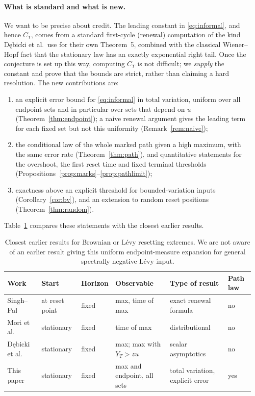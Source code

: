\documentclass[11pt,a4paper]{article}
\begin{document}
\paragraph{What is standard and what is new.}
We want to be precise about credit. The leading constant in \eqref{eq:informal}, and hence $C_T$, comes from a standard first-cycle (renewal) computation of the kind D\k{e}bicki et al.\ use for their own Theorem~5, combined with the classical Wiener--Hopf fact that the stationary law has an exactly exponential right tail. Once the conjecture is set up this way, computing $C_T$ is not difficult; we \emph{supply} the constant and prove that the bounds are strict, rather than claiming a hard resolution. The new contributions are:
\begin{enumerate}
\item an explicit error bound for \eqref{eq:informal} in total variation, uniform over all endpoint sets and in particular over sets that depend on $u$ (Theorem~\ref{thm:endpoint}); a naive renewal argument gives the leading term for each fixed set but not this uniformity (Remark~\ref{rem:naive});
\item the conditional law of the whole marked path given a high maximum, with the same error rate (Theorem~\ref{thm:path}), and quantitative statements for the overshoot, the first reset time and fixed terminal thresholds (Propositions~\ref{prop:marks}--\ref{prop:pathlimit});
\item exactness above an explicit threshold for bounded-variation inputs (Corollary~\ref{cor:bv}), and an extension to random reset positions (Theorem~\ref{thm:random}).
\end{enumerate}
Table~\ref{tab:prior} compares these statements with the closest earlier results.

\begin{table}[h]
\centering\small
\setlength{\tabcolsep}{3pt}\begin{tabular}{@{}>{\raggedright\arraybackslash}p{2.8cm}>{\raggedright\arraybackslash}p{1.7cm}>{\raggedright\arraybackslash}p{1.2cm}>{\raggedright\arraybackslash}p{3.3cm}>{\raggedright\arraybackslash}p{3.0cm}>{\raggedright\arraybackslash}p{1.0cm}@{}}
\toprule
Work & Start & Horizon & Observable & Type of result & Path law \\
\midrule
Singh--Pal \cite{SP2021} & at reset point & fixed & max, time of max & exact renewal formula & no\\
Mori et al.\ \cite{MMS2021} & stationary & fixed & time of max & distributional & no\\
D\k{e}bicki et al.\ \cite{DHM2026} & stationary & fixed & max; max with $Y_T>zu$ & scalar asymptotics & no\\
This paper & stationary & fixed & max and endpoint, all sets & total variation, explicit error & yes\\
\bottomrule
\end{tabular}
\caption{Closest earlier results for Brownian or L\'evy resetting extremes. We are not aware of an earlier result giving this uniform endpoint-measure expansion for general spectrally negative L\'evy input.}
\label{tab:prior}
\end{table}
\end{document}
